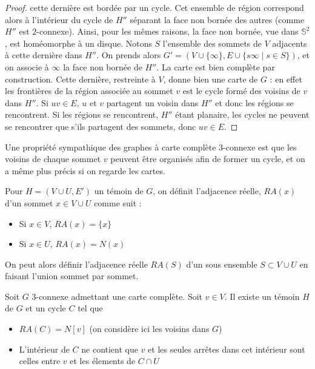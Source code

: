 \documentclass{scrartcl}
\begin{document}
\begin{flushleft}
\begin{proof}
    cette dernière est bordée par un cycle. Cet ensemble de région correspond alors à l'intérieur du cycle de $H''$
    séparant la face non bornée des autres (comme $H''$ est $2$-connexe). Ainsi, pour les mêmes raisons, la face non bornée, vue dans $\mathbb{S}^2$,
    est homéomorphe à un disque. Notons $S$ l'ensemble des sommets de $V$ adjacents à cette dernière dans $H''$.
    On prends alors $G' = (V \cup \{\infty\}, E \cup \{s\infty \mid s \in S \} )$, et on associe à $\infty$ la face non bornée de $H''$.
    La carte est bien complète par construction. Cette dernière, restreinte à $V$, donne bien une carte de $G$ : en effet les frontières
    de la région associée au sommet $v$ est le cycle formé des voisins de $v$ dans $H''$. Si $uv \in E$, $u$ et $v$ partagent un voisin
    dans $H''$ et donc les régions se rencontrent. Si les régions se rencontrent, $H''$ étant planaire, les cycles ne peuvent se rencontrer
    que s'ils partagent des sommets, donc $uv \in E$.

\end{proof}

Une propriété sympathique des graphes à carte complète $3$-connexe est que les voisins de chaque sommet $v$ peuvent être organisés afin
de former un cycle, et on a même plus précis si on regarde les cartes.

\begin{def*}
    Pour $H = (V \cup U, E')$ un témoin de $G$, on définit l'adjacence réelle, $RA(x)$ d'un sommet $x \in V \cup U$ comme suit :
    \begin{itemize}
        \item Si $x \in V$, $RA(x) = \{x\}$
        \item Si $x \in U$, $RA(x) = N(x)$
    \end{itemize}
    On peut alors définir l'adjacence réelle $RA(S)$ d'un sous ensemble $S \subset V \cup U$ en faisant l'union sommet par sommet.
\end{def*}

\begin{prop}\label{cyclSep}
    Soit $G$ $3$-connexe admettant une carte complète. Soit $v \in V$. Il existe un témoin $H$ de $G$ et
    un cycle $C$ tel que
    \begin{itemize}
        \item $RA(C) = N[v]$ (on considère ici les voisins dans $G$)
        \item L'intérieur de $C$ ne contient que $v$ et les seules arrêtes dans cet intérieur sont celles entre $v$ et
        les élements de $C \cap U$
    \end{itemize}
\end{prop}


\end{flushleft}
\end{document}
